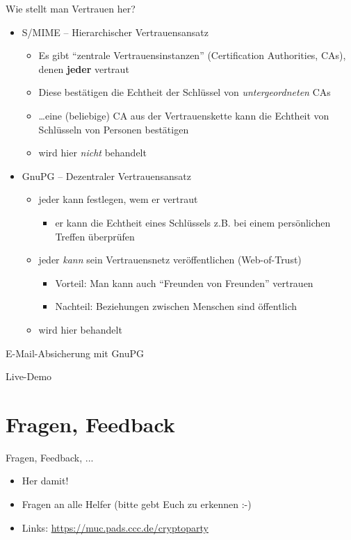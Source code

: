   \begin{frame}{Wie stellt man Vertrauen her?}
    \begin{itemize}
      \item S/MIME -- Hierarchischer Vertrauensansatz
      \begin{itemize}
        \item Es gibt ``zentrale Vertrauensinstanzen'' (Certification Authorities, CAs), denen \textbf{jeder} vertraut
        \item Diese bestätigen die Echtheit der Schlüssel von  \textit{untergeordneten} CAs
        \item \ldots eine (beliebige) CA aus der Vertrauenskette kann die Echtheit von Schlüsseln von Personen bestätigen
        \item wird hier \textit{nicht} behandelt
      \end{itemize}
      \item GnuPG -- Dezentraler Vertrauensansatz
      \begin{itemize}
        \item jeder kann festlegen, wem er vertraut
        \begin{itemize}
          \item er kann die Echtheit eines Schlüssels z.B. bei einem persönlichen Treffen überprüfen
        \end{itemize}
        \item jeder \textit{kann} sein Vertrauensnetz veröffentlichen (Web-of-Trust)
        \begin{itemize}
          \item Vorteil: Man kann auch ``Freunden von Freunden'' vertrauen
          \item Nachteil: Beziehungen zwischen Menschen sind öffentlich 
        \end{itemize}
        \item wird hier behandelt
      \end{itemize}
    \end{itemize}
  \end{frame}

  \begin{frame}{E-Mail-Absicherung mit GnuPG}
    \begin{centering}
      \Huge Live-Demo
    \end{centering}
  \end{frame}

\section{Fragen, Feedback}
  \begin{frame}{Fragen, Feedback, ...}
    \begin{itemize}
      \item{Her damit!}
      \item{Fragen an alle Helfer (bitte gebt Euch zu erkennen :-)}
      \item{Links: \url{https://muc.pads.ccc.de/cryptoparty}}
    \end{itemize}
  \end{frame}
